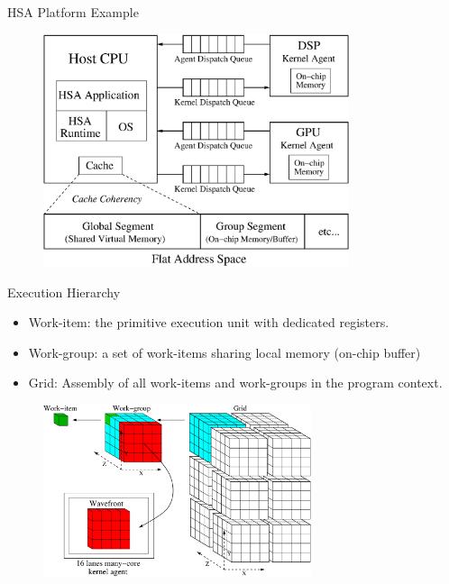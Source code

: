 \documentclass{beamer}
\begin{document}
\begin{CJK}{UTF8}{bkai}
    \begin{frame}{HSA Platform Example}
        \begin{figure}[!ht]
            \centering
            \includegraphics[width=0.8\textwidth]{./figs/systemspec.eps}
            \label{fig:systemspec}
        \end{figure}
    \end{frame}

    \begin{frame}{Execution Hierarchy}
        \begin{itemize}
            \item Work-item: the primitive execution unit with dedicated registers.
            \item Work-group: a set of work-items sharing local memory (on-chip buffer)
            \item Grid: Assembly of all work-items and work-groups in the program context.
        \end{itemize}
        \begin{figure}[!ht] 
            \centering
            \includegraphics[width=0.7\textwidth]{./figs/grid.eps}
            \label{fig:grid}
        \end{figure}
    \end{frame}


\end{CJK}
\end{document}

